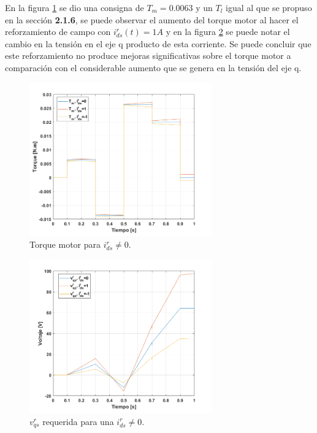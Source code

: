 \documentclass[10pt]{article}
\begin{document}
\begin{itemize}
	En la figura \ref{fig:TTmodulador_id} se dio una consigna de $T_{m}=0.0063$ y un $T_{l}$ igual al que se propuso en la sección \textbf{2.1.6}, se puede observar el aumento del torque motor al hacer el reforzamiento de campo con $i^{r}_{ds}(t)=1 A$ y en la figura \ref{fig:vqmodulador_id} se puede notar el cambio en la tensión en el eje q producto de esta corriente. Se puede concluir que este reforzamiento no produce mejoras significativas sobre el torque motor a comparación con el considerable aumento que se genera en la tensión del eje q.
	 	\begin{figure}[h!]
	\centering
	\includegraphics[width=0.7\textwidth]{TTmodulador_id.png}
	\caption{\label{fig:TTmodulador_id}Torque motor para $i^{r}_{ds}\neq0$.}
	\end{figure}
		 	\begin{figure}[h!]
	\centering
	\includegraphics[width=0.7\textwidth]{Tmodulador_id.png}
	\caption{\label{fig:vqmodulador_id}$v^{r}_{qs}$ requerida para una $i^{r}_{ds}\neq0$.}
	\end{figure}
\end{itemize}
\end{document}
